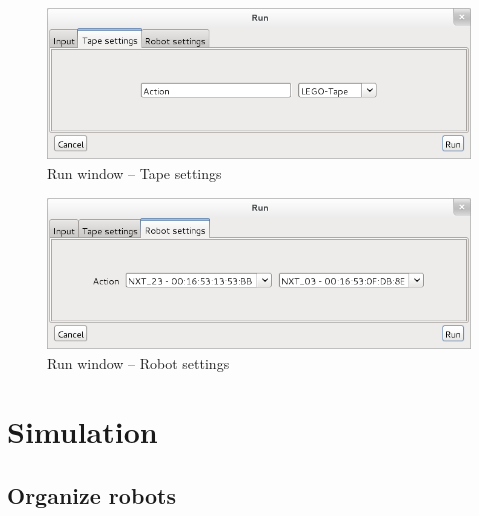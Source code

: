 \documentclass[%
  a4paper,%
  11pt,%
  blue,%
  hyperref	%
  ]{tubsartcl}
\begin{document}
\newpage

\begin{figure}[!htb]
\begin{center}
\includegraphics[scale=0.5]{graphics_gui/run_window_tape_settings.png}
\end{center}
\caption{Run window -- Tape settings}
\label{pic:run_window_tape_settings}
\end{figure}

\newpage

\begin{figure}[!htb]
\begin{center}
\includegraphics[scale=0.5]{graphics_gui/run_window_robot_settings.png}
\end{center}
\caption{Run window -- Robot settings}
\label{pic:run_window_robot_settings}
\end{figure}

\newpage

\section{Simulation}

\subsection{Organize robots}
\end{document}

